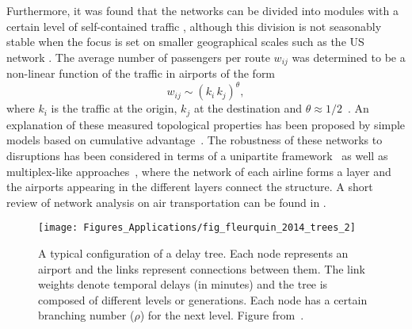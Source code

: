 Furthermore, it was found that the networks can be divided into modules with a certain level of self-contained traffic \cite{guimera_2005_worldwide}, although this division is not seasonably stable when the focus is set on smaller geographical scales such as the US network \cite{lancichinetti_2011_finding}. The average number of passengers per route $w_{ij}$ was determined to be a non-linear function of the traffic in airports of the form 
\begin{equation}
w_{ij} \sim \left(k_i\, k_j\right)^\theta,
\label{eq:wij_air}
\end{equation}
where $k_i$ is the traffic at the origin, $k_j$ at the destination and $\theta \approx 1/2$~\cite{barrat_2004_architecture}. An explanation of these measured topological properties has been proposed by simple models based on cumulative advantage~\cite{guimera_2004_modeling,barrat_2004_architecture}.  
The robustness of these networks to disruptions has been considered in terms of a unipartite framework~\cite{verma_2014_revealing} as well as multiplex-like approaches~\cite{cardillo_2013_modeling}, where the network of each airline forms a layer and the airports appearing in the different layers connect the structure. A short review of network analysis on air transportation can be found in \cite{zanin_2013_modelling}.

\begin{figure}
\centering
\texttt{[image: Figures\_Applications/fig\_fleurquin\_2014\_trees\_2]}
\caption{A typical configuration of a delay tree. Each node represents an airport and the links represent connections between them. The link weights denote temporal delays (in minutes) and the tree is composed of different levels or generations. Each node has a certain branching number ($\rho$) for the next level.  Figure from~\cite{fleurquin_2014_trees}. \label{fig:fleurquin_2014_trees_2}}
\end{figure}


